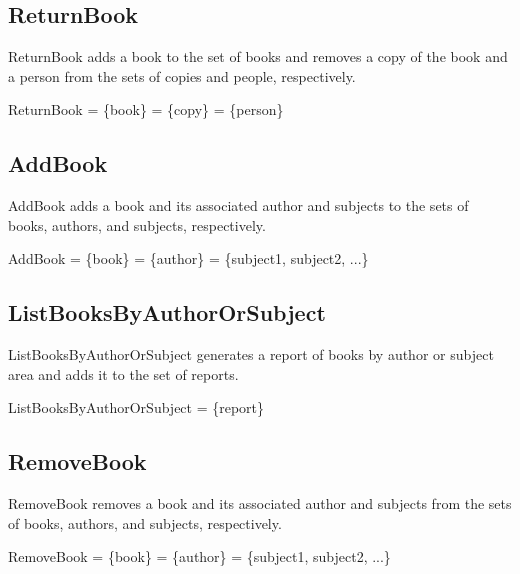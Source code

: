 \documentclass{article}
\begin{document}
\subsection{ReturnBook}
ReturnBook adds a book to the set of books and removes a copy of the book and a person from the sets of copies and people, respectively.
\begin{schema}{ReturnBook}
 =  \cup \{book\}
 =  \setminus \{copy\}
 =  \setminus \{person\}
\end{schema}

\subsection{AddBook}
AddBook adds a book and its associated author and subjects to the sets of books, authors, and subjects, respectively.
\begin{schema}{AddBook}
 =  \cup \{book\}
 =  \cup \{author\}
 =  \cup \{subject1, subject2, ...\}
\end{schema}



\subsection{ListBooksByAuthorOrSubject}
ListBooksByAuthorOrSubject generates a report of books by author or subject area and adds it to the set of reports.
\begin{schema}{ListBooksByAuthorOrSubject}
 =  \cup \{report\}
\end{schema}


\subsection{RemoveBook}
RemoveBook removes a book and its associated author and subjects from the sets of books, authors, and subjects, respectively.
\begin{schema}{RemoveBook}
 =  \setminus \{book\}
 =  \setminus \{author\}
 =  \setminus \{subject1, subject2, ...\}
\end{schema}
\end{document}
